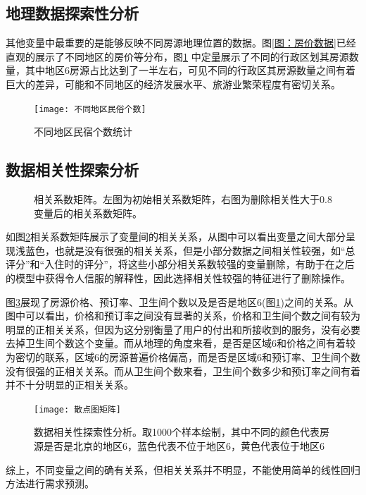 \documentclass{article}
\begin{document}
\begin{multicols}{2}
\subsection{地理数据探索性分析}
其他变量中最重要的是能够反映不同房源地理位置的数据。图\ref{图：房价数据}已经直观的展示了不同地区的房价等分布，图\ref{fig:不同地区民宿个数} 中定量展示了不同的行政区划其房源数量，其中地区6房源占比达到了一半左右，可见不同的行政区其房源数量之间有着巨大的差异，可能和不同地区的经济发展水平、旅游业繁荣程度有密切关系。
\begin{figure}[H]
	\centering
	\texttt{[image: 不同地区民俗个数]}
	\caption{不同地区民宿个数统计}
	\label{fig:不同地区民宿个数}
\end{figure}
\subsection{数据相关性探索分析}
\begin{figure}
	\centering
	\caption{相关系数矩阵。左图为初始相关系数矩阵，右图为删除相关性大于0.8变量后的相关系数矩阵。}
	\label{fig:相关系数矩阵}
\end{figure}
如图\ref{fig:相关系数矩阵}相关系数矩阵展示了变量间的相关关系，从图中可以看出变量之间大部分呈现浅蓝色，也就是没有很强的相关关系，但是小部分数据之间相关性较强，如“总评分”和“入住时的评分”，将这些小部分相关系数较强的变量删除，有助于在之后的模型中获得令人信服的解释性，因此选择相关性较强的特征进行了删除操作。
\par 图\ref{fig:散点图矩阵}展现了房源价格、预订率、卫生间个数以及是否是地区6(图\ref{fig:不同地区民宿个数})之间的关系。从图中可以看出，价格和预订率之间没有显著的关系，价格和卫生间个数之间有较为明显的正相关关系，但因为这分别衡量了用户的付出和所接收到的服务，没有必要去掉卫生间个数这个变量。而从地理的角度来看，是否是区域6和价格之间有着较为密切的联系，区域6的房源普遍价格偏高，而是否是区域6和预订率、卫生间个数没有很强的正相关关系。而从卫生间个数来看，卫生间个数多少和预订率之间有着并不十分明显的正相关关系。
\begin{figure}[!htbp]
	\centering
	\texttt{[image: 散点图矩阵]}
	\caption{数据相关性探索性分析。取1000个样本绘制，其中不同的颜色代表房源是否是北京的地区6，蓝色代表不位于地区6，黄色代表位于地区6}
	\label{fig:散点图矩阵}
\end{figure}
\par 综上，不同变量之间的确有关系，但相关关系并不明显，不能使用简单的线性回归方法进行需求预测。


\end{multicols}
\end{document}

